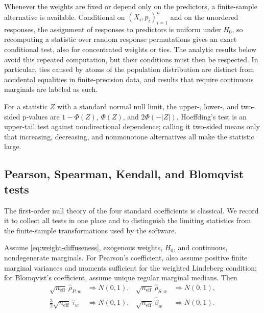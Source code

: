 Whenever the weights are fixed or depend only on the predictors, a
finite-sample alternative is available. Conditional on $(X_i,p_i)_{i=1}^n$
and on the unordered responses, the assignment of responses to predictors is
uniform under $H_0$, so recomputing a statistic over random response
permutations gives an exact conditional test, also for concentrated weights or
ties. The analytic results below avoid this repeated computation, but their
conditions must then be respected. In particular, ties caused by atoms of the
population distribution are distinct from accidental equalities in
finite-precision data, and results that require continuous marginals are
labeled as such.

For a statistic $Z$ with a standard normal null limit, the upper-, lower-, and
two-sided p-values are $1-\Phi(Z)$, $\Phi(Z)$, and $2\Phi(-|Z|)$. Hoeffding's
test is an upper-tail test against nondirectional dependence; calling it
two-sided means only that increasing, decreasing, and nonmonotone alternatives
all make the statistic large.

\subsection{Pearson, Spearman, Kendall, and Blomqvist tests}
\label{subsec:standard-tests}

The first-order null theory of the four standard coefficients is classical.
We record it to collect all tests in one place and to distinguish the limiting
statistics from the finite-sample transformations used by the software.

\begin{proposition}
\label{prop:standard-null-limits}
Assume \eqref{eq:weight-diffuseness}, exogenous weights, $H_0$, and continuous,
nondegenerate marginals. For Pearson's coefficient, also assume positive
finite marginal variances and moments sufficient for the weighted Lindeberg
condition; for Blomqvist's coefficient, assume unique regular marginal
medians. Then
\begin{align*}
  \sqrt{n_{\mathrm{eff}}}\,\widehat\rho_{P,w}
  &\mathrel{\Longrightarrow} N(0,1),
  &
  \sqrt{n_{\mathrm{eff}}}\,\widehat\rho_{S,w}
  &\mathrel{\Longrightarrow} N(0,1),\\
  \frac{3}{2}\sqrt{n_{\mathrm{eff}}}\,\widehat\tau_w
  &\mathrel{\Longrightarrow} N(0,1),
  &
  \sqrt{n_{\mathrm{eff}}}\,\widehat\beta_w
  &\mathrel{\Longrightarrow} N(0,1).
\end{align*}
\end{proposition}

